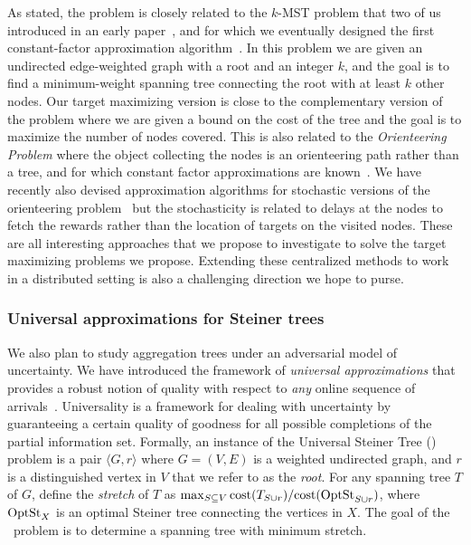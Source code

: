 As stated, the problem is closely related to the $k$-MST problem that two of us introduced in an early paper~\cite{RSMRR94}, and for which we eventually designed the first constant-factor approximation algorithm~\cite{BRV99}. In this problem we are given an undirected edge-weighted graph with a root and an integer $k$, and the goal is to find a minimum-weight spanning tree connecting the root with at least $k$ other nodes. Our target maximizing version is close to the complementary version of the problem where we are given a bound on the cost of the tree and the goal is to maximize the number of nodes covered. This is also related to the {\em Orienteering Problem} where the object collecting the nodes is an orienteering path rather than a tree, and for which constant factor approximations are known~\cite{BCKLMM03}. We have recently also devised approximation algorithms for stochastic versions of the orienteering problem~\cite{GKNR12} but the stochasticity is related to delays at the nodes to fetch the rewards rather than the location of targets on the visited nodes. These are all interesting approaches that we propose to investigate to solve the target maximizing problems we propose. Extending these centralized methods to work in a distributed setting is also a challenging direction we hope to purse.

\iffalse
RELATED WORK: karger-minkoff maybecast tree, gupta-nagarajan-ravi
paper on adaptive TSP (icalp 10), and on stochastic vrp (OR, 2012) and
refs in this for previous papers on TSP with independent demands on
nodes (Bertsimas cycle heuristic). Also the basic expected target max
is like orienteering with size bound on tree, and hence related to
k-MST. Also related to garg-gupta-leonardi-sankowsi (SODA 08) which
relates to Univ TSP.
\fi

\subsubsection{Universal approximations for Steiner trees}
We also plan to study aggregation trees under an adversarial model of
uncertainty.  We have introduced the framework of {\em universal
  approximations}\/ that provides a robust notion of quality with
respect to {\em any} online sequence of
arrivals~\cite{jia+lnrs:universal}.  Universality is a framework for
dealing with uncertainty by guaranteeing a certain quality of goodness
for all possible completions of the partial information set.
Formally, an instance of the Universal Steiner Tree (\ust) problem is
a pair $\langle G , r\rangle$ where $G = (V,E)$ is a weighted
undirected graph, and $r$ is a distinguished vertex in $V$ that we
refer to as the {\em root}.  For any spanning tree $T$ of $G$, define
the {\em stretch}\/ of $T$ as $\max_{S \subseteq V}\mbox{cost}(T_{S\cup
    r})/\mbox{cost}(\mbox{OptSt}_{S\cup r})$, where $\mbox{OptSt}_{X}$ is an optimal
Steiner tree connecting the vertices in $X$.  The goal of the
\ust\ problem is to determine a spanning tree with minimum stretch.

